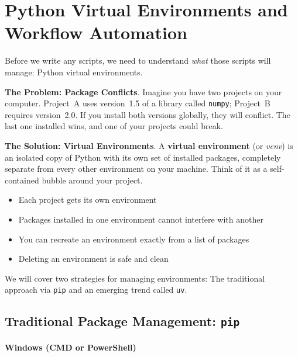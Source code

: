 \chapter{Python Virtual Environments and Workflow Automation}
\label{ch:python-environments}

Before we write any scripts, we need to understand \emph{what} those scripts
will manage: Python virtual environments.

\textbf{The Problem: Package Conflicts}.
Imagine you have two projects on your computer. Project~A uses version~1.5
of a library called \texttt{numpy}; Project~B requires version~2.0. If you
install both versions globally, they will conflict. The last one installed
wins, and one of your projects could break.

\textbf{The Solution: Virtual Environments}.
A \textbf{virtual environment} (or \emph{venv}) is an isolated copy of
Python with its own set of installed packages, completely separate from
every other environment on your machine. Think of it as a self-contained
bubble around your project.

\begin{itemize}
  \item Each project gets its own environment
  \item Packages installed in one environment cannot interfere with another
  \item You can recreate an environment exactly from a list of packages
  \item Deleting an environment is safe and clean
\end{itemize}

We will cover two strategies for managing environments: The traditional 
approach via \texttt{pip} and an emerging trend called \texttt{uv}.

\section{Traditional Package Management: \texttt{pip}}
\label{sec:venvs}
\subsubsection{Windows (CMD or PowerShell)}

